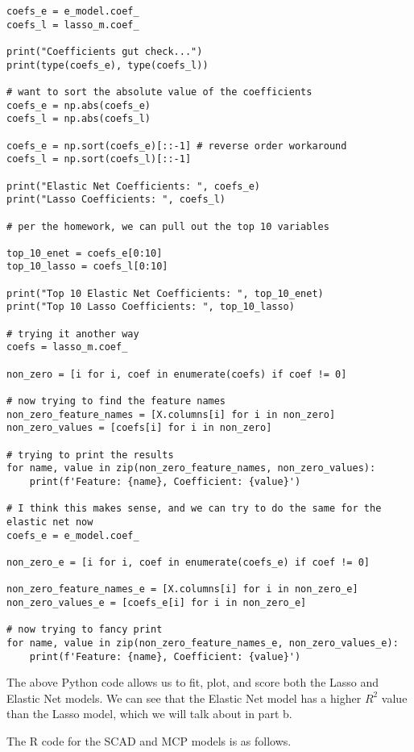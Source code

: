 \documentclass[12pt, letterpaper]{article}
\begin{document}
\begin{verbatim}
coefs_e = e_model.coef_ 
coefs_l = lasso_m.coef_

print("Coefficients gut check...")
print(type(coefs_e), type(coefs_l))

# want to sort the absolute value of the coefficients 
coefs_e = np.abs(coefs_e) 
coefs_l = np.abs(coefs_l) 

coefs_e = np.sort(coefs_e)[::-1] # reverse order workaround 
coefs_l = np.sort(coefs_l)[::-1] 

print("Elastic Net Coefficients: ", coefs_e) 
print("Lasso Coefficients: ", coefs_l) 

# per the homework, we can pull out the top 10 variables 

top_10_enet = coefs_e[0:10] 
top_10_lasso = coefs_l[0:10] 

print("Top 10 Elastic Net Coefficients: ", top_10_enet) 
print("Top 10 Lasso Coefficients: ", top_10_lasso) 

# trying it another way 
coefs = lasso_m.coef_  

non_zero = [i for i, coef in enumerate(coefs) if coef != 0]

# now trying to find the feature names 
non_zero_feature_names = [X.columns[i] for i in non_zero]
non_zero_values = [coefs[i] for i in non_zero]

# trying to print the results 
for name, value in zip(non_zero_feature_names, non_zero_values):
    print(f'Feature: {name}, Coefficient: {value}')

# I think this makes sense, and we can try to do the same for the elastic net now 
coefs_e = e_model.coef_

non_zero_e = [i for i, coef in enumerate(coefs_e) if coef != 0]

non_zero_feature_names_e = [X.columns[i] for i in non_zero_e]
non_zero_values_e = [coefs_e[i] for i in non_zero_e]

# now trying to fancy print 
for name, value in zip(non_zero_feature_names_e, non_zero_values_e):
    print(f'Feature: {name}, Coefficient: {value}')

\end{verbatim}

The above Python code allows us to fit, plot, and score both the Lasso and Elastic Net models. We can see that the Elastic Net model has a higher $R^2$ value than the Lasso model, which we will talk about in part b. 

The R code for the SCAD and MCP models is as follows. 
\end{document}

